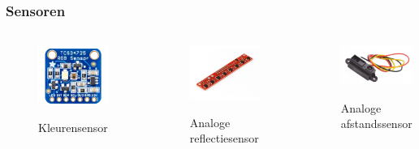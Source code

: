 \documentclass
   [kulak] %
   {kulakbeamer}
\begin{document}
\begin{frame}
	\frametitle{Sensoren}
	\begin{columns}
		\begin{figure}
			\centering
			\includegraphics[width=.7\textwidth]{kleurensensor}
			\caption{Kleurensensor}\cite{TCS34725KleurSensorBOB}
		\end{figure}
		\begin{figure}
			\centering
			\includegraphics[width=.8\textwidth]{reflectiesensor}
			\caption{Analoge reflectiesensor}\cite{QTR-8AAnalogeReflexieSensorArray}
		\end{figure}
		\begin{figure}
			\centering
			\includegraphics[width=.9\textwidth]{afstandssensor}
			\caption{Analoge afstandssensor}\cite{Optischeafstandssensor(analoog)}
		\end{figure}
	\end{columns}
	
	
\end{frame}
\end{document}
